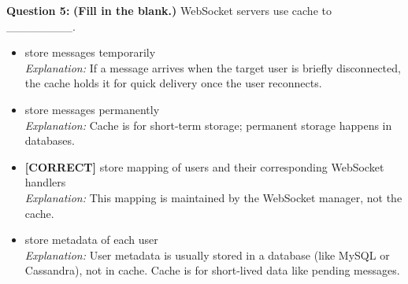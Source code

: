\noindent
\textbf{Question 5:} \textbf{(Fill in the blank.)} WebSocket servers use cache to \_\_\_\_\_\_\_\_.
\\[0.2cm]
\begin{itemize}
 \item store messages temporarily
\\[0.1cm]
\textit{Explanation:} 
If a message arrives when the target user is briefly disconnected, the cache holds it for quick delivery once the user reconnects.
 \item store messages permanently
\\[0.1cm]
\textit{Explanation:} 
Cache is for short-term storage; permanent storage happens in databases.
 \item \textbf{[CORRECT]} store mapping of users and their corresponding WebSocket handlers
\\[0.1cm]
\textit{Explanation:} 
This mapping is maintained by the WebSocket manager, not the cache.
 \item store metadata of each user
\\[0.1cm]
\textit{Explanation:} 
User metadata is usually stored in a database (like MySQL or Cassandra), not in cache. Cache is for short-lived data like pending messages.
\end{itemize}

